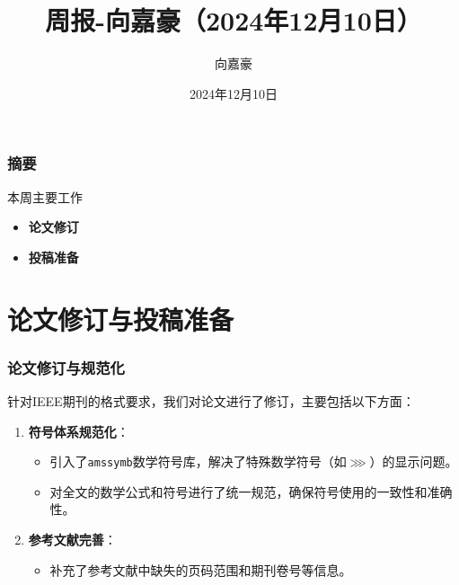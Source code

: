 \documentclass{beamer}
\title{\textbf{周报-向嘉豪（2024年12月10日）}}
\author{向嘉豪}
\institute{衡阳师范学院}
\date{2024年12月10日}
\begin{document}
\begin{frame}
    \titlepage
\end{frame}

\begin{frame}
    \frametitle{摘要}
    \begin{block}{本周主要工作}

        \begin{itemize}
            \item \textbf{论文修订}
           
            \item \textbf{投稿准备}
           
        \end{itemize}
    \end{block}

\end{frame}

\section{论文修订与投稿准备}

\begin{frame}
    \frametitle{论文修订与规范化}
    针对IEEE期刊的格式要求，我们对论文进行了修订，主要包括以下方面：
    \begin{enumerate}
        \item \textbf{符号体系规范化}：
        \begin{itemize}
            \item 引入了\texttt{amssymb}数学符号库，解决了特殊数学符号（如$\ggg$）的显示问题。
            \item 对全文的数学公式和符号进行了统一规范，确保符号使用的一致性和准确性。
        \end{itemize}
        \item \textbf{参考文献完善}：
        \begin{itemize}
            \item 补充了参考文献中缺失的页码范围和期刊卷号等信息。
            
        \end{itemize}
    \end{enumerate}
\end{frame}
\end{document}
